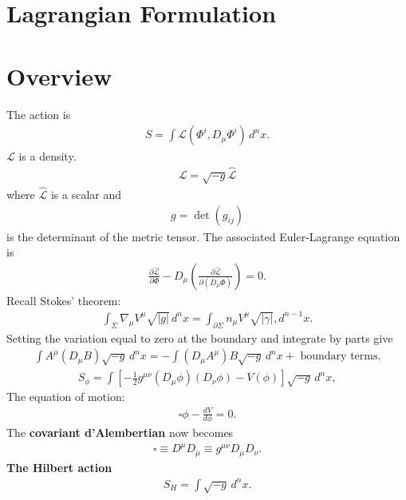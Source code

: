 \documentclass{book}
\numberwithin{equation}{section}
\theoremstyle{definition}
\newcommand{\p}{\partial}
\newcommand{\lag}{\mathcal{L}}
\begin{document}
\section{Lagrangian Formulation}

\section{Overview}



The action is
\begin{align}
S = \int \lag (\Phi^i, D_\mu \Phi^i)\,d^nx.
\end{align}
$\lag$ is a density. 
\begin{align}
\lag = \sqrt{-g}\hat{\lag}
\end{align}
where $\hat{\lag}$ is a scalar and
\begin{align}
g = \det(g_{ij})
\end{align}
is the determinant of the metric tensor. The associated Euler-Lagrange equation is
\begin{align}
\frac{\p \hat{\lag}}{\p \Phi} - D_\mu \left( \frac{\p \hat{\lag}}{\p (D_\mu \Phi)}\right) = 0.
\end{align}
Recall Stokes' theorem:
\begin{align}
\int_\Sigma \nabla_\mu V^\mu \sqrt{\vert g\vert}\,d^nx = \int_{\p\Sigma} n_\mu V^\mu \sqrt{\vert \gamma \vert},d^{n-1}x.
\end{align}
Setting the variation equal to zero at the boundary and integrate by parts give
\begin{align}
\int A^\mu (D_\mu B)\sqrt{-g}\,d^nx = -\int (D_\mu A^\mu)B\sqrt{-g}\,d^n x + \text{ boundary terms}.
\end{align}
\begin{align}
S_\phi = \int \left[ -\frac{1}{2}g^{\mu\nu}(D_\mu \phi)(D_\nu\phi) - V(\phi) \right]\sqrt{-g}\,d^nx,
\end{align}
The equation of motion:
\begin{align}
\square \phi - \frac{dV}{d\phi} = 0.
\end{align}
The \textbf{covariant d'Alembertian} now becomes
\begin{align}
\square \equiv D^\mu D_\mu \equiv g^{\mu\nu}D_\mu D_\nu.
\end{align}
\textbf{The Hilbert action}
\begin{align}
S_H = \int \sqrt{-g}\,d^nx.
\end{align}
\end{document}
